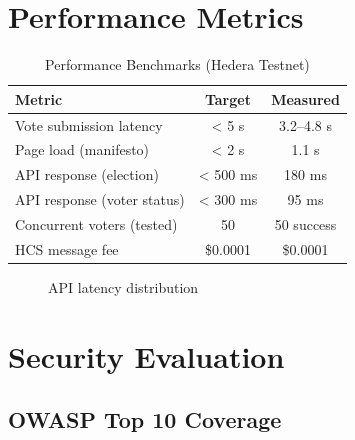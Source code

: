 \section{Performance Metrics}
\label{sec:performance}

\begin{table}[H]
\centering
\caption{Performance Benchmarks (Hedera Testnet)}
\label{tab:performance}
\begin{tabular}{@{}lcc@{}}
\toprule
\textbf{Metric} & \textbf{Target} & \textbf{Measured} \\
\midrule
Vote submission latency & < 5 s & 3.2--4.8 s \\
Page load (manifesto) & < 2 s & 1.1 s \\
API response (election) & < 500 ms & 180 ms \\
API response (voter status) & < 300 ms & 95 ms \\
Concurrent voters (tested) & 50 & 50 success \\
HCS message fee & \$0.0001 & \$0.0001 \\
\midrule
\end{tabular}
\end{table}

\begin{figure}[H]
\centering
{}
\caption{API latency distribution}
\label{fig:latency}
\end{figure}

\section{Security Evaluation}
\label{sec:security-eval}

\subsection{OWASP Top 10 Coverage}

